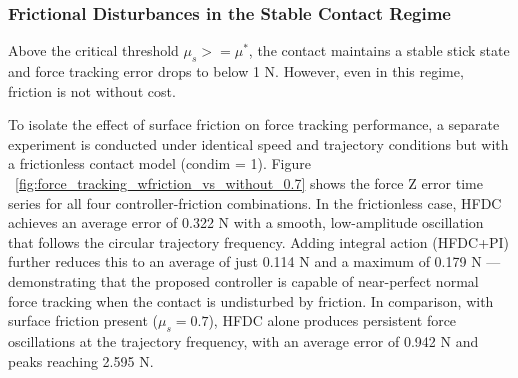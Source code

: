 \documentclass[
	german,%
	accentcolor=9c,%
	ruledheaders=section,%
	class=report,%
	thesis={type=bachelor},%
	fontsize=11pt,%
	parskip=half-,%
	custommargins=true,%
	marginpar=false,%
]{tudapub}
\begin{document}
\subsubsection{Frictional Disturbances in the Stable Contact Regime}

Above the critical threshold $\mu_s >= \mu^*$, the contact maintains a stable stick state and force tracking error drops to below 1 N. However, even in this regime, friction is not without cost.

To isolate the effect of surface friction on force tracking performance, a separate experiment is conducted under identical speed and trajectory conditions but with a frictionless contact model (condim = 1). Figure ~\ref{fig:force_tracking_wfriction_vs_without_0.7} shows the force Z error time series for all four controller-friction combinations. In the frictionless case, HFDC achieves an average error of 0.322 N with a smooth, low-amplitude oscillation that follows the circular trajectory frequency. Adding integral action (HFDC+PI) further reduces this to an average of just 0.114 N and a maximum of 0.179 N — demonstrating that the proposed controller is capable of near-perfect normal force tracking when the contact is undisturbed by friction. In comparison, with surface friction present ($\mu_s=0.7$), HFDC alone produces persistent force oscillations at the trajectory frequency, with an average error of 0.942 N and peaks reaching 2.595 N.
\end{document}
